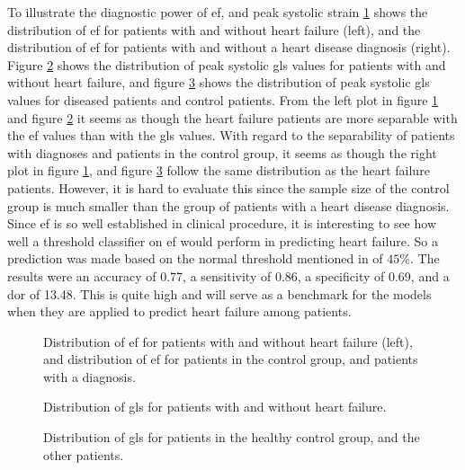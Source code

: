To illustrate the diagnostic power of \acrshort{ef}, and peak systolic strain \ref{fig:ef_hf_ind_dist} shows the distribution of \acrshort{ef} for patients with and without heart failure (left), and the distribution of \acrshort{ef} for patients with and without a heart disease diagnosis (right). Figure \ref{fig:gls_hf_dist} shows the distribution of peak systolic \acrshort{gls} values for patients with and without heart failure, and figure \ref{fig:gls_ind_dist} shows the distribution of peak systolic \acrshort{gls} values for diseased patients and control patients. From the left plot in figure \ref{fig:ef_hf_ind_dist} and figure \ref{fig:gls_hf_dist} it seems as though the heart failure patients are more separable with the \acrshort{ef} values than with the \acrshort{gls} values. With regard to the separability of patients with diagnoses and patients in the control group, it seems as though the right plot in figure \ref{fig:ef_hf_ind_dist}, and figure \ref{fig:gls_ind_dist} follow the same distribution as the heart failure patients. However, it is hard to evaluate this since the sample size of the control group is much smaller than the group of patients with a heart disease diagnosis. Since \acrshort{ef} is so well established in clinical procedure, it is interesting to see how well a threshold classifier on \acrshort{ef} would perform in predicting heart failure. So a prediction was made based on the normal threshold mentioned in \textcite{myocardial_imaging} of $45\%$. The results were an accuracy of 0.77, a sensitivity of 0.86, a specificity of 0.69, and a \acrshort{dor} of 13.48. This is quite high and will serve as a benchmark for the models when they are applied to predict heart failure among patients.  
\bigskip

\begin{figure}
    \centering
    
    \caption{Distribution of \acrshort{ef} for patients with and without heart failure (left), and distribution of \acrshort{ef} for patients in the control group, and patients with a diagnosis.}
    \label{fig:ef_hf_ind_dist}
\end{figure}

\begin{figure}
    \centering
    
    \caption{Distribution of \acrshort{gls} for patients with and without heart failure.}
    \label{fig:gls_hf_dist}
\end{figure}

\begin{figure}
    \centering
    
    \caption{Distribution of \acrshort{gls} for patients in the healthy control group, and the other patients.}
    \label{fig:gls_ind_dist}
\end{figure}

